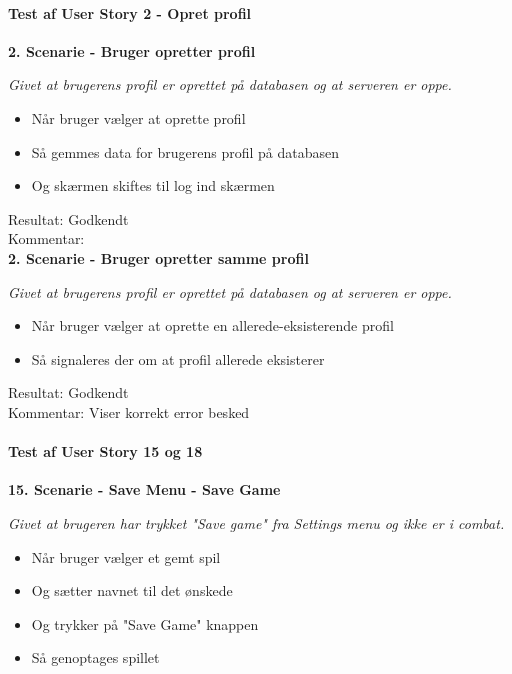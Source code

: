 \paragraph{Test af User Story 2 - Opret profil}

\textbf{2. Scenarie - Bruger opretter profil}

\textit{Givet at brugerens profil er oprettet på databasen og at serveren er oppe.}

\begin{itemize}
  \item Når bruger vælger at oprette profil
  \item Så gemmes data for brugerens profil på databasen
  \item Og skærmen skiftes til log ind skærmen
\end{itemize}

Resultat: Godkendt\\
Kommentar:\\

\textbf{2. Scenarie - Bruger opretter samme profil}

\textit{Givet at brugerens profil er oprettet på databasen og at serveren er oppe.}

\begin{itemize}
  \item Når bruger vælger at oprette en allerede-eksisterende profil
  \item Så signaleres der om at profil allerede eksisterer
\end{itemize}

Resultat: Godkendt\\
Kommentar: Viser korrekt error besked\\

\paragraph{Test af User Story 15 og 18}

\textbf{15. Scenarie - Save Menu - Save Game}

\textit{Givet at brugeren har trykket "Save game" fra Settings menu og ikke er i combat.}

\begin{itemize}
  \item Når bruger vælger et gemt spil
  \item Og sætter navnet til det ønskede
  \item Og trykker på "Save Game" knappen
  \item Så genoptages spillet
\end{itemize}

